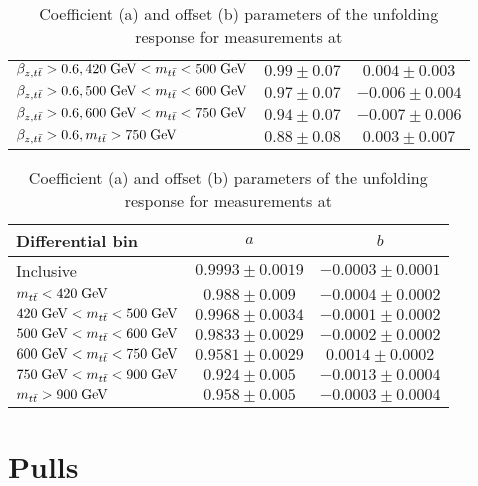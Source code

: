 \begin{table}[htbp]
\begin{center}
\begin{tabular}{l c c}
      $\beta_{z,t\bar{t}}{}>0.6, 420\; \mathrm{GeV}{}<m_{t\bar{t}}{}<500\; \mathrm{GeV}{}$& $0.99\pm0.07$  & $0.004\pm0.003$  \\
      $\beta_{z,t\bar{t}}{}>0.6, 500\; \mathrm{GeV}{}<m_{t\bar{t}}{}<600\; \mathrm{GeV}{}$& $0.97\pm0.07$  & $-0.006\pm0.004$\\
      $\beta_{z,t\bar{t}}{}>0.6, 600\; \mathrm{GeV}{}<m_{t\bar{t}}{}<750\; \mathrm{GeV}{}$& $0.94\pm0.07$ & $-0.007\pm0.006$\\
      $\beta_{z,t\bar{t}}{}>0.6, m_{t\bar{t}}{} >750\; \mathrm{GeV}{}$& $0.88\pm0.08$ & $0.003\pm0.007$\\
      \bottomrule
     \end{tabular}
   \end{center}
  \caption{Coefficient (a) and offset (b) parameters of the unfolding
    response for measurements at \seventev{}}
  \label{tab:unf:response7tev}
\end{table}

\begin{table}[htbp]
  \begin{center}
    \begin{tabular}{l c c}
      \toprule
      Differential bin & $a$ & $b$ \\
      \midrule
      Inclusive & $0.9993\pm0.0019$ & $-0.0003\pm0.0001$\\
      \midrule
      $m_{t\bar{t}}{}<420\; \mathrm{GeV}{}$                & $0.988\pm0.009$  & $-0.0004\pm0.0002$\\
      $420\; \mathrm{GeV}{}<m_{t\bar{t}}{}<500\; \mathrm{GeV}{}$& $0.9968\pm0.0034$  & $-0.0001\pm0.0002$  \\
      $500\; \mathrm{GeV}{}<m_{t\bar{t}}{}<600\; \mathrm{GeV}{}$& $0.9833\pm0.0029$  & $-0.0002\pm0.0002$\\
      $600\; \mathrm{GeV}{}<m_{t\bar{t}}{}<750\; \mathrm{GeV}{}$& $0.9581\pm0.0029$ & $0.0014\pm0.0002$\\
      $750\; \mathrm{GeV}{}<m_{t\bar{t}}{}<900\; \mathrm{GeV}{}$& $0.924\pm0.005$ & $-0.0013\pm0.0004$\\
      $m_{t\bar{t}}{}>900\; \mathrm{GeV}{}$                & $0.958\pm0.005$ & $-0.0003\pm0.0004$\\
      \bottomrule
     \end{tabular}
   \end{center}
  \caption{Coefficient (a) and offset (b) parameters of the unfolding
    response for measurements at \eighttev{}}
  \label{tab:unf:response8tev}
\end{table}

\section{Pulls}
\label{app:unfolding:pulls}

